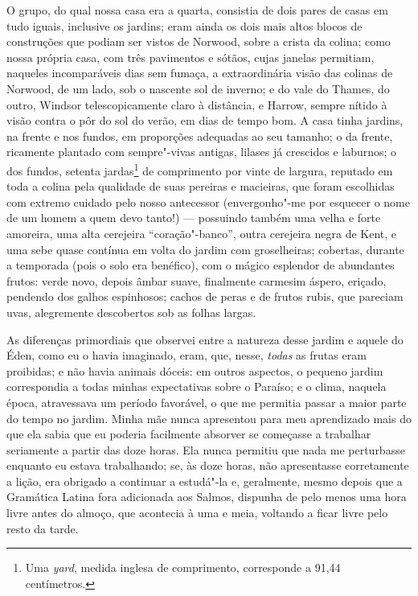 O grupo, do qual nossa casa era a quarta, consistia de dois pares de
casas em tudo iguais, inclusive os jardins; eram ainda os dois mais
altos blocos de construções que podiam ser vistos de Norwood, sobre a
crista da colina; como nossa própria casa, com três pavimentos e sótãos,
cujas janelas permitiam, naqueles incomparáveis dias sem fumaça, a
extraordinária visão das colinas de Norwood, de um lado, sob o nascente
sol de inverno; e do vale do Thames, do outro, Windsor telescopicamente
claro à distância, e Harrow, sempre nítido à visão contra o pôr do sol
do verão, em dias de tempo bom. A casa tinha jardins, na frente e nos
fundos, em proporções adequadas ao seu tamanho; o da frente, ricamente
plantado com sempre"-vivas antigas, lilases já crescidos e laburnos; o
dos fundos, setenta jardas\footnote{Uma \textit{yard}, medida inglesa de
  comprimento, corresponde a 91,44 centímetros.} de comprimento
por vinte de largura, reputado em toda a colina pela qualidade de suas
pereiras e macieiras, que foram escolhidas com extremo cuidado pelo
nosso antecessor (envergonho"-me por esquecer o nome de um homem a quem
devo tanto!) --- possuindo também uma velha e forte amoreira, uma alta
cerejeira ``coração"-banco'', outra cerejeira negra de Kent, e uma sebe
quase contínua em volta do jardim com groselheiras; cobertas, durante a
temporada (pois o solo era benéfico), com o mágico esplendor de
abundantes frutos: verde novo, depois âmbar suave, finalmente carmesim
áspero, eriçado, pendendo dos galhos espinhosos; cachos de peras e de
frutos rubis, que pareciam uvas, alegremente descobertos sob as folhas
largas.

As diferenças primordiais que observei entre a natureza desse jardim
e aquele do Éden, como eu o havia imaginado, eram, que, nesse,
\textit{todas} as frutas eram proibidas; e não havia animais dóceis: em
outros aspectos, o pequeno jardim correspondia a todas minhas
expectativas sobre o Paraíso; e o clima, naquela época, atravessava um
período favorável, o que me permitia passar a maior parte do tempo no
jardim. Minha mãe nunca apresentou para meu aprendizado mais do que ela
sabia que eu poderia facilmente absorver se começasse a trabalhar
seriamente a partir das doze horas. Ela nunca permitiu que nada me
perturbasse enquanto eu estava trabalhando; se, às doze horas, não
apresentasse corretamente a lição, era obrigado a continuar a estudá"-la
e, geralmente, mesmo depois que a Gramática Latina fora adicionada aos
Salmos, dispunha de pelo menos uma hora livre antes do almoço, que
acontecia à uma e meia, voltando a ficar livre pelo resto da tarde.

